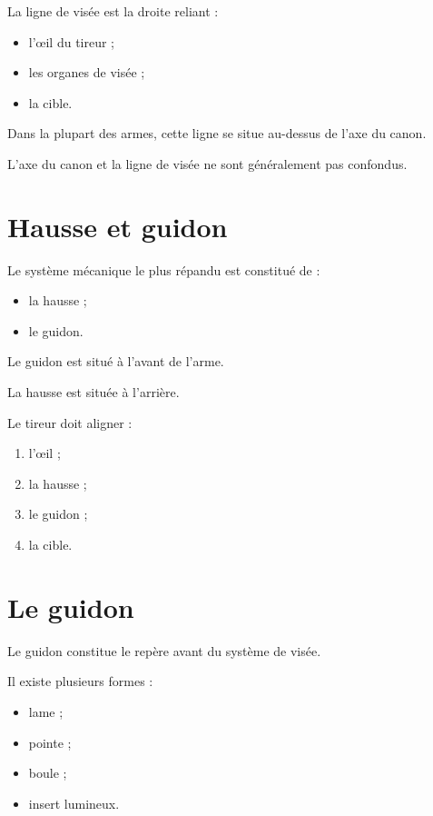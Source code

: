 La ligne de visée est la droite reliant :

\begin{itemize}
    \item l'œil du tireur ;
    \item les organes de visée ;
    \item la cible.
\end{itemize}

Dans la plupart des armes, cette ligne se situe au-dessus de l'axe du canon.

\begin{aretenir}

L'axe du canon et la ligne de visée ne sont généralement pas confondus.

\end{aretenir}

\section{Hausse et guidon}

Le système mécanique le plus répandu est constitué de :

\begin{itemize}
    \item la hausse ;
    \item le guidon.
\end{itemize}

Le guidon est situé à l'avant de l'arme.

La hausse est située à l'arrière.

Le tireur doit aligner :

\begin{enumerate}
    \item l'œil ;
    \item la hausse ;
    \item le guidon ;
    \item la cible.
\end{enumerate}

\section{Le guidon}

Le guidon constitue le repère avant du système de visée.

Il existe plusieurs formes :

\begin{itemize}
    \item lame ;
    \item pointe ;
    \item boule ;
    \item insert lumineux.
\end{itemize}

